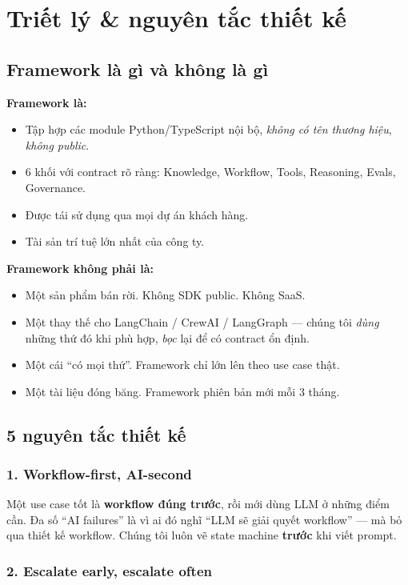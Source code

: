 \documentclass[11pt,a4paper]{article}
\begin{document}
\section{Triết lý \& nguyên tắc thiết kế}

\subsection{Framework là gì và không là gì}

\textbf{Framework là:}
\begin{itemize}
\item Tập hợp các module Python/TypeScript nội bộ, \textit{không có tên thương hiệu}, \textit{không public}.
\item 6 khối với contract rõ ràng: Knowledge, Workflow, Tools, Reasoning, Evals, Governance.
\item Được tái sử dụng qua mọi dự án khách hàng.
\item Tài sản trí tuệ lớn nhất của công ty.
\end{itemize}

\textbf{Framework không phải là:}
\begin{itemize}
\item Một sản phẩm bán rời. Không SDK public. Không SaaS.
\item Một thay thế cho LangChain / CrewAI / LangGraph --- chúng tôi \textit{dùng} những thứ đó khi phù hợp, \textit{bọc} lại để có contract ổn định.
\item Một cái ``có mọi thứ''. Framework chỉ lớn lên theo use case thật.
\item Một tài liệu đóng băng. Framework phiên bản mới mỗi 3 tháng.
\end{itemize}

\subsection{5 nguyên tắc thiết kế}

\subsubsection*{1. Workflow-first, AI-second}

Một use case tốt là \textbf{workflow đúng trước}, rồi mới dùng LLM ở những điểm
cần. Đa số ``AI failures'' là vì ai đó nghĩ ``LLM sẽ giải quyết workflow'' --- mà
bỏ qua thiết kế workflow. Chúng tôi luôn vẽ state machine \textbf{trước} khi viết
prompt.

\subsubsection*{2. Escalate early, escalate often}
\end{document}
